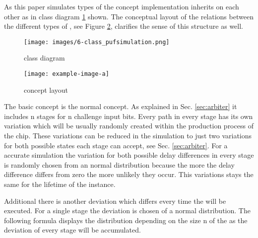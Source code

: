 As this paper simulates types of \apufs the concept implementation inherits on each other as in class diagram \ref{class:pufsimulation} shown. The conceptual layout of the relations between the different types of \apufs, see Figure \ref{fig:pufconceptlayout}, clarifies the sense of this structure as well.

\begin{figure}[ht]
\texttt{[image: images/6-class\_pufsimulation.png]}
\caption{\apufs class diagram}
\label{class:pufsimulation}
\end{figure}

\begin{figure}[ht]
\noindent\texttt{[image: example-image-a]}
\caption{\apufs concept layout}
\label{fig:pufconceptlayout}
\end{figure}

The basic concept is the normal \apuf concept. 
As explained in Sec. \ref{sec:arbiter} it includes n stages for n challenge input bits.
Every path in every stage has its own variation which will be usually randomly created within the production process of the chip. 
These variations can be reduced in the simulation to just two variations for both possible states each stage can accept, see Sec. \ref{sec:arbiter}.
For a accurate simulation the variation for both possible delay differences in every stage is randomly chosen from an normal distribution because the more the delay difference differs from zero the more unlikely they occur.
This variations stays the same for the lifetime of the \puf instance.

Additional there is another deviation which differs every time the \puf will be executed.
For a single stage the deviation is chosen of a normal distribution. 
The following formula displays the distribution depending on the size n of the \puf as the deviation of every stage will be accumulated.

